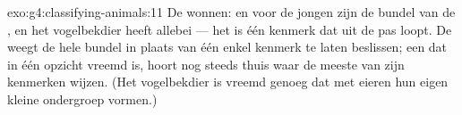 \begin{solution}{exo:g4:classifying-animals:11}
De  wonnen:  en  voor de jongen zijn de bundel van
de , en het vogelbekdier heeft allebei --- het  is één
kenmerk dat uit de pas loopt. De  weegt de hele bundel in
plaats van één enkel kenmerk te laten beslissen; een  dat in één
opzicht vreemd is, hoort nog steeds thuis waar de meeste van zijn
kenmerken wijzen. (Het vogelbekdier is vreemd genoeg dat  met
eieren hun eigen kleine ondergroep vormen.)
\end{solution}
